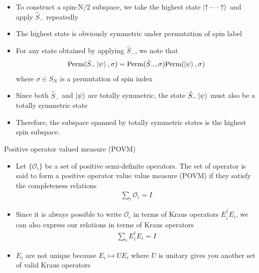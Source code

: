 \documentclass[aspectratio=169,xcolor=dvipsnames, t]{beamer}
\begin{document}
\begin{frame}
    \begin{itemize}
        \item To construct a spin-N/2 subspace, we take the highest state $\ket{\uparrow \cdots \uparrow}$ and apply $\hat S_{-}$ repeatedly
        \item The highest state is obviously symmetric under permutation of spin label
        \vspace{.5cm}
        \item For any state obtained by applying $\hat S_{-}$, we note that 
        \begin{align*}
            \text{Perm}(\hat S_{-}\Ket{\psi},\sigma) = \text{Perm}(\hat S_{-}, \sigma) \text{Perm}(\ket{\psi},\sigma)
        \end{align*}
        where $\sigma \in S_N$ is a permutation of spin index 
        \item Since both $\hat S_{-}$ and $\ket{\psi}$ are totally symmetric, the state $\hat S_- \ket{\psi}$ must also be a totally symmetric state
        \vspace{.5cm}
        \item Therefore, the subspace spanned by totally symmetric states is the highest spin subspace.
    \end{itemize}
\end{frame}

\begin{frame}{Positive operator valued measure (POVM)}
    \begin{itemize}
        \item Let $\{\mathcal O_i\}$ be a set of positive semi-definite operators. The set of operator is said to form a positive operator value value measure (POVM) if they satisfy the completeness relations
        \begin{align*}
            \sum_i \mathcal O_i = I
        \end{align*}
        \item Since it is always possible to write $\mathcal O_i$ in terms of Kraus operators $E_i^\dagger E_i$, we can also express our relations in terms of Kraus operators
        \begin{align*}
            \sum_i  E_i^\dagger E_i = I
        \end{align*}
        \item $E_i$ are not unique because $E_i \mapsto U E_i$ where $U$ is unitary gives you another set of valid Kraus operators 
    \end{itemize}
\end{frame}
\end{document}
